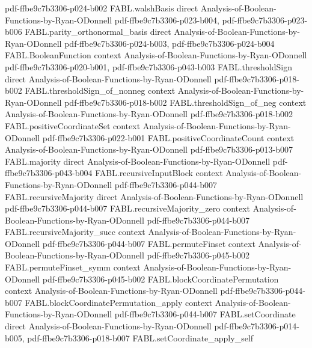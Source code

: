 \begin{theorem}
  {pdf-ffbe9c7b3306-p024-b002}
\proofstep
  {FABL.walshBasis}
  {direct}
  {Analysis-of-Boolean-Functions-by-Ryan-ODonnell}
  {pdf-ffbe9c7b3306-p023-b004,
    pdf-ffbe9c7b3306-p023-b006}
\proofstep
  {FABL.parity_orthonormal_basis}
  {direct}
  {Analysis-of-Boolean-Functions-by-Ryan-ODonnell}
  {pdf-ffbe9c7b3306-p024-b003,
    pdf-ffbe9c7b3306-p024-b004}
\proofstep
  {FABL.BooleanFunction}
  {context}
  {Analysis-of-Boolean-Functions-by-Ryan-ODonnell}
  {pdf-ffbe9c7b3306-p020-b001,
    pdf-ffbe9c7b3306-p043-b003}
\proofstep
  {FABL.thresholdSign}
  {direct}
  {Analysis-of-Boolean-Functions-by-Ryan-ODonnell}
  {pdf-ffbe9c7b3306-p018-b002}
\proofstep
  {FABL.thresholdSign_of_nonneg}
  {context}
  {Analysis-of-Boolean-Functions-by-Ryan-ODonnell}
  {pdf-ffbe9c7b3306-p018-b002}
\proofstep
  {FABL.thresholdSign_of_neg}
  {context}
  {Analysis-of-Boolean-Functions-by-Ryan-ODonnell}
  {pdf-ffbe9c7b3306-p018-b002}
\proofstep
  {FABL.positiveCoordinateSet}
  {context}
  {Analysis-of-Boolean-Functions-by-Ryan-ODonnell}
  {pdf-ffbe9c7b3306-p022-b001}
\proofstep
  {FABL.positiveCoordinateCount}
  {context}
  {Analysis-of-Boolean-Functions-by-Ryan-ODonnell}
  {pdf-ffbe9c7b3306-p013-b007}
\proofstep
  {FABL.majority}
  {direct}
  {Analysis-of-Boolean-Functions-by-Ryan-ODonnell}
  {pdf-ffbe9c7b3306-p043-b004}
\proofstep
  {FABL.recursiveInputBlock}
  {context}
  {Analysis-of-Boolean-Functions-by-Ryan-ODonnell}
  {pdf-ffbe9c7b3306-p044-b007}
\proofstep
  {FABL.recursiveMajority}
  {direct}
  {Analysis-of-Boolean-Functions-by-Ryan-ODonnell}
  {pdf-ffbe9c7b3306-p044-b007}
\proofstep
  {FABL.recursiveMajority_zero}
  {context}
  {Analysis-of-Boolean-Functions-by-Ryan-ODonnell}
  {pdf-ffbe9c7b3306-p044-b007}
\proofstep
  {FABL.recursiveMajority_succ}
  {context}
  {Analysis-of-Boolean-Functions-by-Ryan-ODonnell}
  {pdf-ffbe9c7b3306-p044-b007}
\proofstep
  {FABL.permuteFinset}
  {context}
  {Analysis-of-Boolean-Functions-by-Ryan-ODonnell}
  {pdf-ffbe9c7b3306-p045-b002}
\proofstep
  {FABL.permuteFinset_symm}
  {context}
  {Analysis-of-Boolean-Functions-by-Ryan-ODonnell}
  {pdf-ffbe9c7b3306-p045-b002}
\proofstep
  {FABL.blockCoordinatePermutation}
  {context}
  {Analysis-of-Boolean-Functions-by-Ryan-ODonnell}
  {pdf-ffbe9c7b3306-p044-b007}
\proofstep
  {FABL.blockCoordinatePermutation_apply}
  {context}
  {Analysis-of-Boolean-Functions-by-Ryan-ODonnell}
  {pdf-ffbe9c7b3306-p044-b007}
\proofstep
  {FABL.setCoordinate}
  {direct}
  {Analysis-of-Boolean-Functions-by-Ryan-ODonnell}
  {pdf-ffbe9c7b3306-p014-b005,
    pdf-ffbe9c7b3306-p018-b007}
\proofstep
  {FABL.setCoordinate_apply_self}

\end{theorem}
